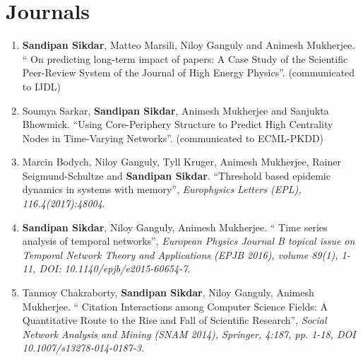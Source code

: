 \section*{Journals}
\begin{enumerate}

\item  {\bf Sandipan Sikdar}, Matteo Marsili, Niloy Ganguly and Animesh Mukherjee. `` On predicting long-term impact of papers: A Case Study of the Scientific Peer-Review System of the Journal of High Energy Physics''. (communicated to IJDL)

\item  Soumya Sarkar, {\bf Sandipan Sikdar}, Animesh Mukherjee and Sanjukta Bhowmick. ``Using Core-Periphery Structure to Predict High Centrality Nodes in Time-Varying Networks''. (communicated to ECML-PKDD)

\item  Marcin Bodych, Niloy Ganguly, Tyll Kruger, Animesh Mukherjee, Rainer Seigmund-Schultze and {\bf Sandipan Sikdar}. ``Threshold based epidemic dynamics in systems with memory'', {\em Europhysics Letters (EPL), 116.4(2017):48004}.

\item  {\bf Sandipan Sikdar}, Niloy Ganguly, Animesh Mukherjee. `` Time series analysis of temporal networks'', {\em  European Physics Journal B topical issue on  Temporal Network Theory and Applications (EPJB 2016), volume 89(1), 1-11, DOI: 10.1140/epjb/e2015-60654-7}.

\item  Tanmoy Chakraborty, {\bf Sandipan Sikdar}, Niloy Ganguly, Animesh Mukherjee. `` Citation Interactions among Computer Science Fields: A Quantitative Route to the Rise and Fall of Scientific Research'', {\em Social Network Analysis and Mining 
(SNAM 2014), Springer, 4:187, pp. 1-18, DOI 10.1007/s13278-014-0187-3}.

\end{enumerate}

